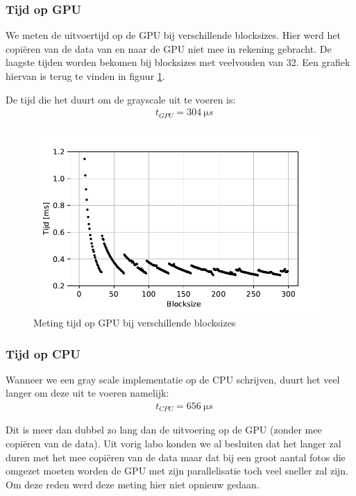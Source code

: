 \documentclass[11pt,twoside,a4paper]{article}
\begin{document}
\subsubsection{Tijd op GPU}

We meten de uitvoertijd op de GPU bij verschillende blocksizes. Hier werd het copi\"eren van de data van en naar de GPU niet mee in rekening gebracht. De laagste tijden worden bekomen bij blocksizes met veelvouden van 32. Een grafiek hiervan is terug te vinden in figuur \ref{fig:meting_grayscale_gpu}.

De tijd die het duurt om de grayscale uit te voeren is:
\begin{align*}
    &t_{GPU} = \SI{304}{\micro s}
\end{align*}


\begin{figure}[h!]
    \centering
    \includegraphics[]{gpu_grayscale.pdf}
    \caption{Meting tijd op GPU bij verschillende blocksizes}
    \label{fig:meting_grayscale_gpu}
\end{figure}


\subsubsection{Tijd op CPU}

Wanneer we een gray scale implementatie op de CPU schrijven, duurt het veel langer om deze uit te voeren namelijk:
\begin{align*}
    &t_{CPU} = \SI{656}{\micro s}
\end{align*}

Dit is meer dan dubbel zo lang dan de uitvoering op de GPU (zonder mee copi\"eren van de data). Uit vorig labo konden we al besluiten dat het langer zal duren met het mee copi\"eren van de data maar dat bij een groot aantal fotos die omgezet moeten worden de GPU met zijn parallelisatie toch veel sneller zal zijn. Om deze reden werd deze meting hier niet opnieuw gedaan.
\end{document}
